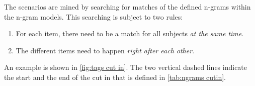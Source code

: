 The scenarios are mined by searching for matches of the defined n-grams within the n-gram models. 
This searching is subject to two rules:
\begin{enumerate}
	\item For each item, there need to be a match for all subjects \emph{at the same time}.
	\item The different items need to happen \emph{right after each other}. 
\end{enumerate}
An example is shown in \cref{fig:tags cut in}. 
The two vertical dashed lines indicate the start and the end of the cut in that is defined in \cref{tab:ngrams cutin}.
\cendb

\begin{figure*}
	\centering
	
	\caption{\cstartb Example of tags describing a cut in. Note that only the tags that are relevant for the cut in, as defined in \cref{tab:ngrams cutin}, are shown.\cendb}
	\label{fig:tags cut in}
\end{figure*}




